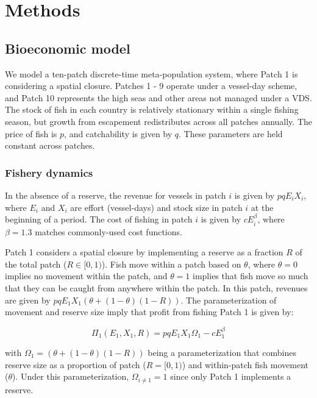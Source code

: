 \documentclass[12pt]{article}
\begin{document}
\clearpage

\section{Methods}

\subsection{Bioeconomic model}

We model a ten-patch discrete-time meta-population system, where Patch 1 is considering a spatial closure. Patches 1 - 9 operate under a vessel-day scheme, and Patch 10 represents the high seas and other areas not managed under a VDS. The stock of fish in each country is relatively stationary within a single fishing season, but  growth from escapement redistributes across all patches annually. The price of fish is $p$, and catchability is given by $q$. These parameters are held constant across patches.

\subsubsection{Fishery dynamics}

In the absence of a reserve, the revenue for vessels in patch $i$ is given by $pqE_iX_i$, where $E_i$ and $X_i$ are effort (vessel-days) and stock size in patch $i$ at the beginning of a period. The cost of fishing in patch $i$ is given by $cE_i^\beta$, where $\beta = 1.3$ matches commonly-used cost functions.

Patch 1 considers a spatial closure by implementing a reserve as a fraction $R$ of the total patch ($R \in[0,1)$). Fish move within a patch based on $\theta$, where $\theta = 0$ implies no movement within the patch, and $\theta = 1$ implies that fish move so much that they can be caught from anywhere within the patch. In this patch, revenues are given by $pqE_1X_1(\theta + (1 - \theta)(1 - R))$. The parameterization of movement and reserve size imply that profit from fishing Patch 1 is given by:

$$
\Pi_1(E_1,X_1,R) = pqE_1X_1\Omega_1-cE_1^\beta
$$

\noindent with $\Omega_1 = (\theta + (1 - \theta)(1 - R))$ being a parameterization that combines reserve size as a proportion of patch ($R =  [0, 1)$) and within-patch fish movement ($\theta$). Under this parameterization, $\Omega_{i \neq 1} = 1$ since only Patch 1 implements a reserve.
\end{document}

